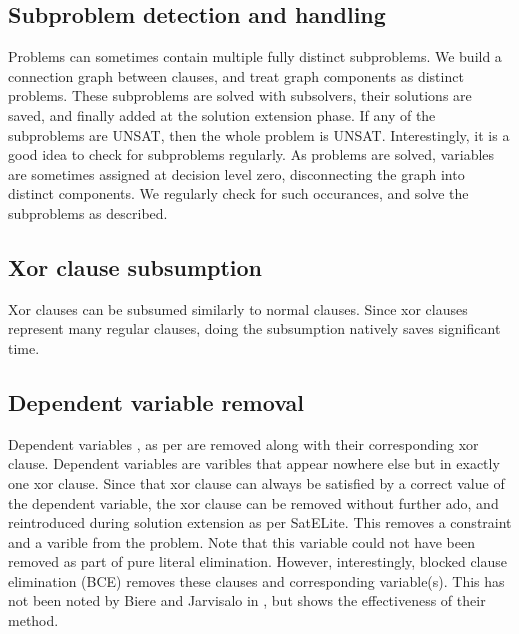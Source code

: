 \documentclass[final]{ieee}
\begin{document}
\subsection{Subproblem detection and handling}
Problems can sometimes contain multiple fully distinct subproblems. We build a connection graph between clauses, and treat graph components as distinct problems. These subproblems are solved with subsolvers, their solutions are saved, and finally added at the solution extension phase. If any of the subproblems are UNSAT, then the whole problem is UNSAT. Interestingly, it is a good idea to check for subproblems regularly. As problems are solved, variables are sometimes assigned at decision level zero, disconnecting the graph into distinct components. We regularly check for such occurances, and solve the subproblems as described.

\subsection{Xor clause subsumption}
Xor clauses can be subsumed similarly to normal clauses. Since xor clauses represent many regular clauses, doing the subsumption natively saves significant time.

\subsection{Dependent variable removal}
Dependent variables , as per \cite{Heule-phd} are removed along with their corresponding xor clause. Dependent variables are varibles that appear nowhere else but in exactly one xor clause. Since that xor clause can always be satisfied by a correct value of the dependent variable, the xor clause can be removed without further ado, and reintroduced during solution extension as per SatELite. This removes a constraint and a varible from the problem. Note that this variable could not have been removed as part of pure literal elimination. However, interestingly, blocked clause elimination (BCE) removes these clauses and corresponding variable(s). This has not been noted by Biere and Jarvisalo in \cite{DBLP:conf/tacas/JarvisaloBH10}, but shows the effectiveness of their method.
\end{document}
